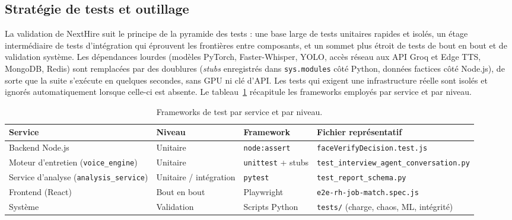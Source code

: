 \subsection{Stratégie de tests et outillage}

La validation de NextHire suit le principe de la pyramide des tests : une base large de tests
unitaires rapides et isolés, un étage intermédiaire de tests d'intégration qui éprouvent les
frontières entre composants, et un sommet plus étroit de tests de bout en bout et de validation
système. Les dépendances lourdes (modèles PyTorch, Faster-Whisper, YOLO, accès réseau aux
API Groq et Edge TTS, MongoDB, Redis) sont remplacées par des doublures
(\textit{stubs} enregistrés dans \texttt{sys.modules} côté Python, données factices côté
Node.js), de sorte que la suite s'exécute en quelques secondes, sans GPU ni clé d'API. Les
tests qui exigent une infrastructure réelle sont isolés et ignorés automatiquement lorsque
celle-ci est absente. Le tableau~\ref{tab:test-frameworks} récapitule les frameworks employés
par service et par niveau.

\begin{table}[H]
  \centering
  \footnotesize
  \renewcommand{\arraystretch}{1.3}
  \setlength{\tabcolsep}{5pt}
  \begin{tabularx}{\textwidth}{|>{\raggedright\arraybackslash}p{3.4cm}|>{\raggedright\arraybackslash}p{2.3cm}|>{\raggedright\arraybackslash}p{3.0cm}|>{\raggedright\arraybackslash}X|}
    \hline
    \rowcolor{blue!10}
    \textbf{Service} & \textbf{Niveau} & \textbf{Framework} & \textbf{Fichier représentatif} \\
    \hline
    Backend Node.js & Unitaire & \texttt{node:assert} & \texttt{faceVerifyDecision.test.js} \\
    \hline
    Moteur d'entretien (\texttt{voice\_engine}) & Unitaire & \texttt{unittest} + stubs & \texttt{test\_interview\_agent\_conversation.py} \\
    \hline
    Service d'analyse (\texttt{analysis\_service}) & Unitaire / intégration & \texttt{pytest} & \texttt{test\_report\_schema.py} \\
    \hline
    Frontend (React) & Bout en bout & Playwright & \texttt{e2e-rh-job-match.spec.js} \\
    \hline
    Système & Validation & Scripts Python & \texttt{tests/} (charge, chaos, ML, intégrité) \\
    \hline
  \end{tabularx}
  \caption{Frameworks de test par service et par niveau.}
  \label{tab:test-frameworks}
\end{table}

